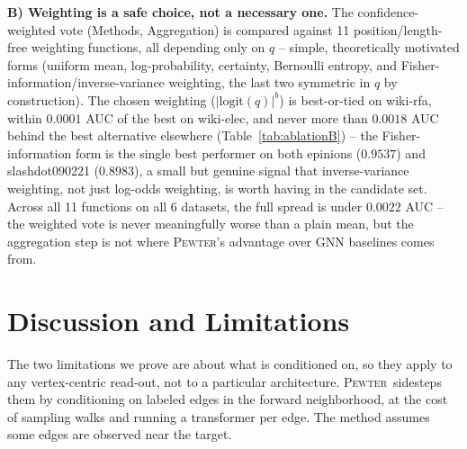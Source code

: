 \documentclass[letterpaper]{article} %
\newcommand{\method}{\textsc{Pewter}\xspace}
\theoremstyle{plain}
\theoremstyle{definition}
\begin{document}
\textbf{B) Weighting is a safe choice, not a necessary one.} The confidence-weighted vote (Methods, Aggregation) is compared against 11 position/length-free weighting functions, all depending only on $q$ -- simple, theoretically motivated forms (uniform mean, log-probability, certainty, Bernoulli entropy, and Fisher-information/inverse-variance weighting, the last two symmetric in $q$ by construction). The chosen weighting ($|\mathrm{logit}(q)|^b$) is best-or-tied on wiki-rfa, within $0.0001$ AUC of the best on wiki-elec, and never more than $0.0018$ AUC behind the best alternative elsewhere (Table~\ref{tab:ablationB}) -- the Fisher-information form is the single best performer on both epinions ($0.9537$) and slashdot090221 ($0.8983$), a small but genuine signal that inverse-variance weighting, not just log-odds weighting, is worth having in the candidate set. Across all 11 functions on all 6 datasets, the full spread is under $0.0022$ AUC -- the weighted vote is never meaningfully worse than a plain mean, but the aggregation step is not where \method's advantage over GNN baselines comes from.

\section{Discussion and Limitations}
The two limitations we prove are about what is conditioned on, so they apply to any vertex-centric read-out, not to a particular architecture. \method\ sidesteps them by conditioning on labeled edges in the forward neighborhood, at the cost of sampling walks and running a transformer per edge. The method assumes some edges are observed near the target.
\end{document}
